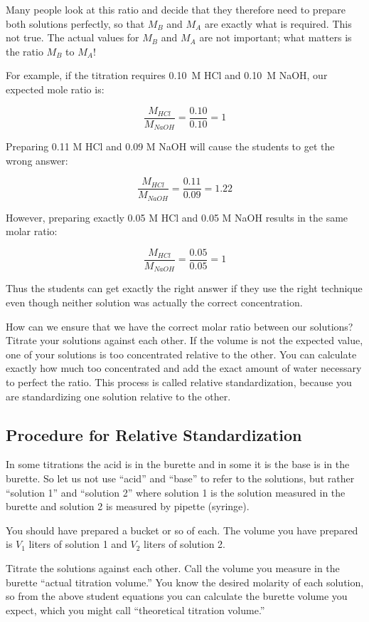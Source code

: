 Many people look at this ratio and decide that they therefore need to prepare both solutions perfectly, so that $ M_{B} $ and $ M_{A} $ are exactly what is required. This not true. The actual values for $ M_{B} $ and $ M_{A} $ are not important; what matters is the ratio $ M_{B} $ to $ M_{A} $!

For example, if the titration requires 0.10~M HCl and 0.10~M NaOH, our expected mole ratio is:

\[ \frac{M_{HCl}}{M_{NaOH}} = \frac{0.10}{0.10} = 1 \]

Preparing 0.11 M HCl and 0.09 M NaOH will cause the students to get the wrong answer:

\[ \frac{M_{HCl}}{M_{NaOH}} = \frac{0.11}{0.09} = 1.22 \]

However, preparing exactly 0.05 M HCl and 0.05 M NaOH results in the same molar ratio:

\[ \frac{M_{HCl}}{M_{NaOH}} = \frac{0.05}{0.05} = 1 \]

Thus the students can get exactly the right answer if they use the right technique even though neither solution was actually the correct concentration.

How can we ensure that we have the correct molar ratio between our solutions? Titrate your solutions against each other. If the volume is not the expected value, one of your solutions is too concentrated relative to the other. You can calculate exactly how much too concentrated and add the exact amount of water necessary to perfect the ratio. This process is called relative standardization, because you are standardizing one solution relative to the other.

\subsection{Procedure for Relative Standardization}
\label{sub:relstand}
In some titrations the acid is in the burette and in some it is the base is in the burette. So let us not use ``acid'' and ``base'' to refer to the solutions, but rather ``solution 1'' and ``solution 2'' where solution 1 is the solution measured in the burette and solution 2 is measured by pipette (syringe).

You should have prepared a bucket or so of each. The volume you have prepared is $ V_{1} $ liters of solution 1 and $ V_{2} $ liters of solution 2.

Titrate the solutions against each other. Call the volume you measure in the burette ``actual titration volume.''  You know the desired molarity of each solution, so from the above student equations you can calculate the burette volume you expect, which you might call ``theoretical titration volume.''

